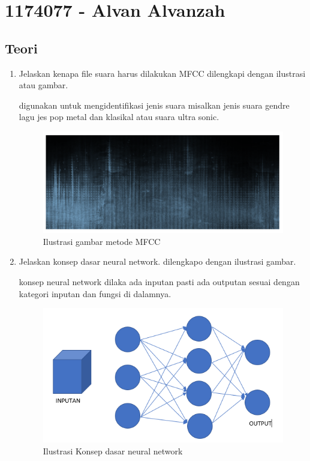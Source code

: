 \section{1174077 - Alvan Alvanzah}
\subsection{Teori}

\begin{enumerate}

\item Jelaskan kenapa file suara harus dilakukan MFCC dilengkapi dengan ilustrasi atau gambar.\par
digunakan untuk mengidentifikasi jenis suara misalkan jenis suara gendre lagu jes pop metal dan klasikal atau suara ultra sonic.
\begin{figure}[ht]
\centering
\includegraphics[scale=0.5]{figures/1174077/6/1,1.PNG}
\caption{Ilustrasi gambar metode MFCC}
\label{contoh}
\end{figure}


\item Jelaskan konsep dasar neural network. dilengkapo dengan ilustrasi gambar. \par
konsep neural network dilaka ada inputan pasti ada outputan sesuai dengan kategori inputan dan fungsi di dalamnya.
\begin{figure}[ht]
\centering
\includegraphics[scale=0.5]{figures/1174077/6/1,2.PNG}
\caption{Ilustrasi Konsep dasar neural network}
\label{contoh}
\end{figure}



\end{enumerate}
